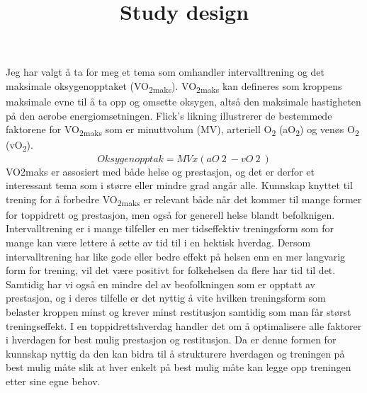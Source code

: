 \documentclass[
  letterpaper,
  DIV=11,
  numbers=noendperiod]{scrartcl}
\title{Study design}
\author{}
\date{}
\begin{document}
\maketitle
\ifdefined\Shaded\renewenvironment{Shaded}{\begin{tcolorbox}[sharp corners, interior hidden, borderline west={3pt}{0pt}{shadecolor}, enhanced, breakable, frame hidden, boxrule=0pt]}{\end{tcolorbox}}\fi

Jeg har valgt å ta for meg et tema som omhandler intervalltrening og det
maksimale oksygenopptaket (VO\textsubscript{2maks}).
VO\textsubscript{2maks} kan defineres som kroppens maksimale evne til å
ta opp og omsette oksygen, altså den maksimale hastigheten på den aerobe
energiomsetningen. Flick's likning illustrerer de bestemmede faktorene
for VO\textsubscript{2maks} som er minuttvolum (MV), arteriell
O\textsubscript{2} (aO\textsubscript{2}) og venøs O\textsubscript{2}
(vO\textsubscript{2}). \[Oksygenopptak = MV x (aO~2~ - vO~2~)\] VO2maks
er assosiert med både helse og prestasjon, og det er derfor et
interessant tema som i større eller mindre grad angår alle. Kunnskap
knyttet til trening for å forbedre VO\textsubscript{2maks} er relevant
både når det kommer til mange former for toppidrett og prestasjon, men
også for generell helse blandt befolknigen. Intervalltrening er i mange
tilfeller en mer tidseffektiv treningsform som for mange kan være
lettere å sette av tid til i en hektisk hverdag. Dersom intervalltrening
har like gode eller bedre effekt på helsen enn en mer langvarig form for
trening, vil det være positivt for folkehelsen da flere har tid til det.
Samtidig har vi også en mindre del av beofolkningen som er opptatt av
prestasjon, og i deres tilfelle er det nyttig å vite hvilken
treningsform som belaster kroppen minst og krever minst restitusjon
samtidig som man får størst treningseffekt. I en toppidrettshverdag
handler det om å optimalisere alle faktorer i hverdagen for best mulig
prestasjon og restitusjon. Da er denne formen for kunnskap nyttig da den
kan bidra til å strukturere hverdagen og treningen på best mulig måte
slik at hver enkelt på best mulig måte kan legge opp treningen etter
sine egne behov.
\end{document}

